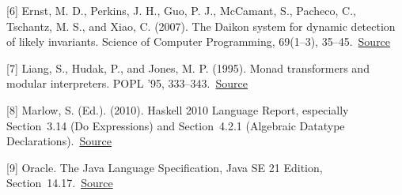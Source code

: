 \documentclass[11pt,a4paper]{article}
\begin{document}
{\small [6] Ernst, M. D., Perkins, J. H., Guo, P. J., McCamant, S., Pacheco, C., Tschantz, M. S., and Xiao, C. (2007). The Daikon system for dynamic detection of likely invariants. Science of Computer Programming, 69(1--3), 35--45.\ \href{https://doi.org/10.1016/j.scico.2007.01.015}{Source}\par}

{\small [7] Liang, S., Hudak, P., and Jones, M. P. (1995). Monad transformers and modular interpreters. POPL '95, 333--343.\ \href{https://doi.org/10.1145/199448.199528}{Source}\par}

{\small [8] Marlow, S. (Ed.). (2010). Haskell 2010 Language Report, especially Section~3.14 (Do Expressions) and Section~4.2.1 (Algebraic Datatype Declarations).\ \href{https://www.haskell.org/onlinereport/haskell2010/}{Source}\par}

{\small [9] Oracle. The Java Language Specification, Java SE 21 Edition, Section~14.17.\ \href{https://docs.oracle.com/javase/specs/jls/se21/html/jls-14.html\#jls-14.17}{Source}\par}
\endgroup
\end{document}
